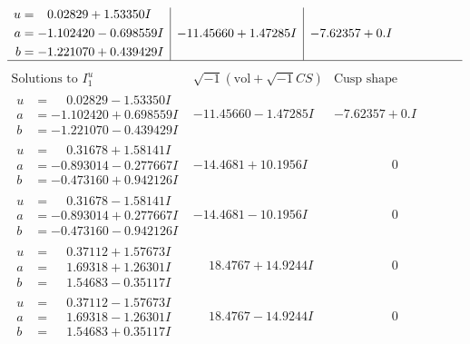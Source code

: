 \documentclass[1p]{elsarticle_modified}
\theoremstyle{definition}
\newcommand{\I}{\sqrt{-1}}
\begin{document}
$$\begin{array}{c|c|c}
\begin{aligned}
u &= \phantom{-}0.02829 + 1.53350 I \\
a &= -1.102420 - 0.698559 I \\
b &= -1.221070 + 0.439429 I\end{aligned}
 & -11.45660 + 1.47285 I & -7.62357 + 0. I\phantom{ +0.000000I}\\
 \hline 
 \end{array}$$\newpage$$\begin{array}{c|c|c}  
\text{Solutions to }I^u_{1}& \I (\text{vol} + \sqrt{-1}CS) & \text{Cusp shape}\\
 \hline 
\begin{aligned}
u &= \phantom{-}0.02829 - 1.53350 I \\
a &= -1.102420 + 0.698559 I \\
b &= -1.221070 - 0.439429 I\end{aligned}
 & -11.45660 - 1.47285 I & -7.62357 + 0. I\phantom{ +0.000000I} \\ \hline\begin{aligned}
u &= \phantom{-}0.31678 + 1.58141 I \\
a &= -0.893014 - 0.277667 I \\
b &= -0.473160 + 0.942126 I\end{aligned}
 & -14.4681 + 10.1956 I & \phantom{-0.000000 } 0 \\ \hline\begin{aligned}
u &= \phantom{-}0.31678 - 1.58141 I \\
a &= -0.893014 + 0.277667 I \\
b &= -0.473160 - 0.942126 I\end{aligned}
 & -14.4681 - 10.1956 I & \phantom{-0.000000 } 0 \\ \hline\begin{aligned}
u &= \phantom{-}0.37112 + 1.57673 I \\
a &= \phantom{-}1.69318 + 1.26301 I \\
b &= \phantom{-}1.54683 - 0.35117 I\end{aligned}
 & \phantom{-}18.4767 + 14.9244 I & \phantom{-0.000000 } 0 \\ \hline\begin{aligned}
u &= \phantom{-}0.37112 - 1.57673 I \\
a &= \phantom{-}1.69318 - 1.26301 I \\
b &= \phantom{-}1.54683 + 0.35117 I\end{aligned}
 & \phantom{-}18.4767 - 14.9244 I & \phantom{-0.000000 } 0 \\ \hline\begin{aligned}

\end{aligned}
\end{array}$$
\end{document}
